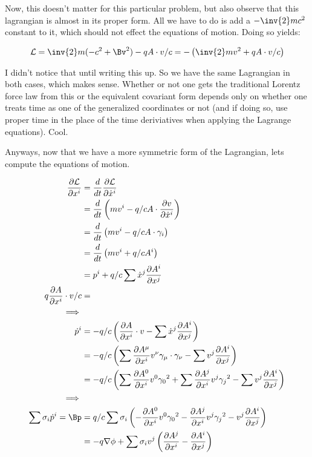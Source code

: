 \documentclass{article}
\newcommand{\grad}[0]{\nabla}
\newcommand{\LL}[0]{\mathcal{L}}
\newcommand{\xdot}[0]{\dot{x}}
\newcommand{\PD}[2]{\frac{\partial {#2}}{\partial {#1}}}
\begin{document}
Now, this doesn't matter for this particular problem, but also observe that this lagrangian is almost in its proper form.  All we have to do is add a $-\inv{2} m c^2$ constant to it, which should not effect the equations of motion.  Doing so yields:

\begin{equation*}
\LL = \inv{2} m (-c^2 + \Bv^2) - q A \cdot v/c = - \left( \inv{2} mv^2 + q A \cdot v/c \right)
\end{equation*}

I didn't notice that until writing this up.  So we have the same Lagrangian in both cases, which makes sense.  Whether or not one gets the traditional Lorentz force law from this
or the equivalent covariant form depends only on whether one treats time as one of the generalized coordinates or not (and if doing so, use proper time in the place of the time
deriviatives when applying the Lagrange equations).  Cool.

Anyways, now that we have a more symmetric form of the Lagrangian, lets compute the equations of motion.

\begin{align*}
\PD{x^i}{\LL}
&= \frac{d}{dt} \PD{\xdot^i}{\LL} \\
&= \frac{d}{dt} \left(m v^i - q/c A \cdot \PD{\xdot^i}{v} \right) \\
&= \frac{d}{dt} \left(m v^i - q/c A \cdot \gamma_i \right) \\
&= \frac{d}{dt} \left(m v^i + q/c A^i \right) \\
&= p^i + q/c \sum \xdot^j \PD{x^j}{A^i} \\
q \PD{x^i}{A} \cdot v/c &= \\
\implies \\
\dot{p}^i 
&= -q/c \left( \PD{x^i}{A} \cdot v - \sum \xdot^j \PD{x^j}{A^i} \right) \\
&= -q/c \left( \sum \PD{x^i}{A^{\mu}} v^{\nu} \gamma_{\mu} \cdot \gamma_{\nu} - \sum v^j \PD{x^j}{A^i} \right) \\
&= -q/c \left( \sum \PD{x^i}{A^0} v^0 {\gamma_0}^2 +\sum \PD{x^i}{A^j} v^j {\gamma_j}^2 - \sum v^j \PD{x^j}{A^i} \right) \\
\implies \\
\sum \sigma_i \dot{p}^i = \Bp
&= q/c \sum \sigma_i \left( -\PD{x^i}{A^0} v^0 {\gamma_0}^2 - \PD{x^i}{A^j} v^j {\gamma_j}^2 - v^j \PD{x^j}{A^i} \right) \\
&= -q \grad \phi + \sum \sigma_i v^j \left( \PD{x^i}{A^j} - \PD{x^j}{A^i} \right) \\
\end{align*}
\end{document}
